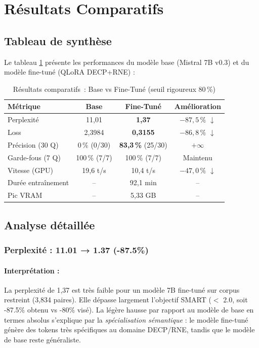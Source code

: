\section{Résultats Comparatifs}

\subsection{Tableau de synthèse}

Le tableau \ref{tab:results_comparison} présente les performances du modèle base (Mistral 7B v0.3) et du modèle fine-tuné (QLoRA DECP+RNE) :

\begin{table}[H]
\centering
\caption{Résultats comparatifs~: Base vs Fine-Tuné (seuil rigoureux 80\,\%)}
\label{tab:results_comparison}
\begin{tabular}{@{}lccc@{}}
\toprule
\textbf{Métrique} & \textbf{Base} & \textbf{Fine-Tuné} & \textbf{Amélioration} \\ \midrule
Perplexité & 11,01 & \textbf{1,37} & $-87{,}5\,\%$ $\downarrow$ \\
Loss & 2,3984 & \textbf{0,3155} & $-86{,}8\,\%$ $\downarrow$ \\
Précision (30 Q) & 0\,\% (0/30) & \textbf{83,3\,\%} (25/30) & $+\infty$ \\
Garde-fous (7 Q) & 100\,\% (7/7) & 100\,\% (7/7) & Maintenu \\
Vitesse (GPU) & 19,6 t/s & 10,4 t/s & $-47{,}0\,\%$ $\downarrow$ \\
Durée entraînement & -- & 92,1 min & -- \\
Pic VRAM & -- & 5,33 GB & -- \\
\bottomrule
\end{tabular}
\end{table}

\subsection{Analyse détaillée}

\subsubsection{Perplexité : 11.01 → 1.37 (-87.5\%)}

\paragraph{Interprétation :} 
La perplexité de 1,37 est très faible pour un modèle 7B fine-tuné sur corpus restreint (3,834 paires). Elle dépasse largement l'objectif SMART ($<$ 2.0, soit -87.5\% obtenu vs -80\% visé). La légère hausse par rapport au modèle de base en termes absolus s'explique par la \textit{spécialisation sémantique} : le modèle fine-tuné génère des tokens très spécifiques au domaine DECP/RNE, tandis que le modèle de base reste généraliste.

